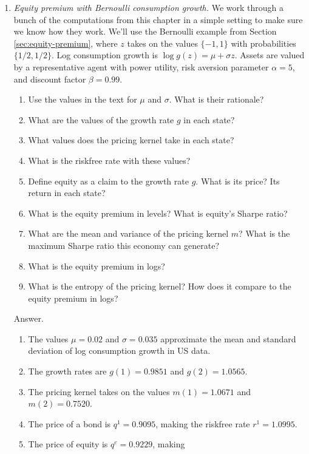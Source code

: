\documentclass[11pt]{article}
\begin{document}
\begin{enumerate}

\item {\it Equity premium with Bernoulli consumption growth.\/}
We work through a bunch of the computations from this chapter
in a simple setting to make sure we know how they work.
We'll use the Bernoulli example from Section \ref{sec:equity-premium},
where  $ z $  takes on the values $\{-1, 1\}$ with probabilities $\{ 1/2, 1/2 \}$.
Log consumption growth is $ \log g(z) = \mu + \sigma z$.
Assets are valued by a representative agent with power utility,
risk aversion parameter $\alpha = 5$, and discount factor $\beta = 0.99$.

\begin{enumerate}
\item Use the values in the text for $\mu$ and $\sigma$.
What is their rationale?
\item What are the values of the growth rate $g$ in each state?
\item What values does the pricing kernel take in each state?
\item What is the riskfree rate with these values?
\item Define equity as a claim to the growth rate $g$.
What is its price?
Its return in each state?
\item What is the equity premium in levels?
What is equity's Sharpe ratio?
\item What are the mean and variance of the pricing kernel $m$?
What is the maximum Sharpe ratio this economy can generate?
\item What is the equity premium in logs?
\item What is the entropy of the pricing kernel?
How does it compare to the equity premium in logs?
\end{enumerate}
%
Answer.
\begin{enumerate}
\item The values $\mu = 0.02$ and $\sigma = 0.035$ approximate
the mean and standard deviation of log consumption growth in US data.
\item The growth rates are $ g(1) =  0.9851 $ and $g(2) = 1.0565 $.
\item The pricing kernel takes on the values
$ m(1) = 1.0671$ and $m(2) = 0.7520 $.
\item The price of a bond is $q^1 = 0.9095$, making the riskfree rate
$ r^1 = 1.0995 $.
\item The price of equity is $ q^e =  0.9229$, making

\end{enumerate}
\end{enumerate}
\end{document}
